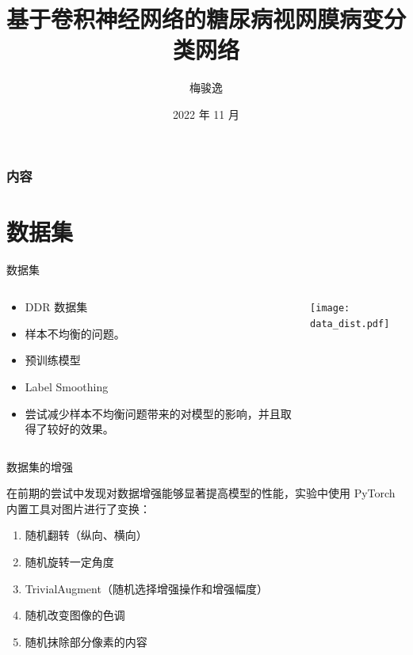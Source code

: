 \documentclass[9pt, aspectratio=1610]{beamer}
\title[基于卷积神经网络的糖尿病视网膜病变分类网络]{基于卷积神经网络的糖尿病视网膜病变分类网络}
\author[梅骏逸]{梅骏逸\quad 2111876}
\institute[]{网络空间安全学院\quad 信息安全、法学}
\date[2022 年 11 月]{2022 年 11 月}
\begin{document}
\frame{\titlepage}
\begin{frame}
\frametitle{内容}
\tableofcontents
\end{frame}
\section{数据集}
    \begin{frame}{数据集}
    \begin{columns}
        \begin{column}{0.5\textwidth}
            \begin{itemize}
                \item DDR 数据集\cite{LI2019}
                \item 样本不均衡的问题。
                \item 预训练模型
                \item Label Smoothing
                \item 尝试减少样本不均衡问题带来的对模型的影响，并且取得了较好的效果。
            \end{itemize}
        \end{column}
        \begin{column}{0.5\textwidth}
            \centering
            \texttt{[image: data\_dist.pdf]}
        \end{column}
    \end{columns}


    \end{frame}

    \begin{frame}{数据集的增强}

    在前期的尝试中发现对数据增强能够显著提高模型的性能，实验中使用 PyTorch 内置工具对图片进行了变换：
    \begin{enumerate}
        \item 随机翻转（纵向、横向）
        \item 随机旋转一定角度
        \item TrivialAugment（随机选择增强操作和增强幅度）
        \item 随机改变图像的色调
        \item 随机抹除部分像素的内容
    \end{enumerate}
        
    \end{frame}
\end{document}
